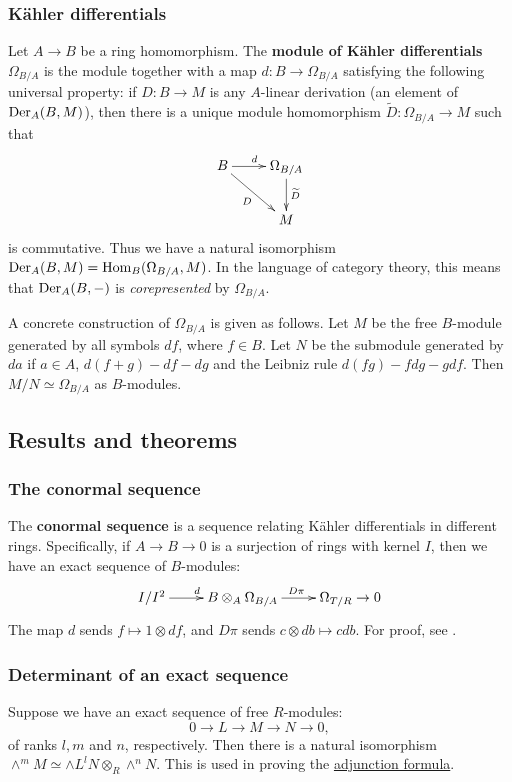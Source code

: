 \documentclass[11pt, english]{article}
\begin{document}
\subsubsection{Kähler differentials}
\label{kahlerdifferentials}

Let $A \to B$ be a ring homomorphism. The \textbf{module of Kähler differentials} $\Omega_{B/A}$ is the module together with a map $d:B \to \Omega_{B/A}$ satisfying the following universal property: if $D:B \to M$ is any $A$-linear derivation (an element of $\operatorname{Der}_A(B,M)$), then there is a unique module homomorphism $\widetilde D:\Omega_{B/A} \to M$ such that
\[
\xymatrix{
B \ar[r]^d  \ar[dr]_D & \Omega_{B/A} \ar[d]^{\widetilde D} \\
 & M
}
\]
is commutative. Thus we have a natural isomorphism $\operatorname{Der}_A(B,M)=\operatorname{Hom}_B(\Omega_{B/A},M)$. In the language of category theory, this means that $\operatorname{Der}_A(B,-)$ is \emph{corepresented} by $\Omega_{B/A}$. 

A concrete construction of $\Omega_{B/A}$ is given as follows. Let $M$ be the free $B$-module generated by all symbols $df$, where $f \in B$. Let $N$ be the submodule generated by $da$ if $a \in A$, $d(f+g)-df-dg$ and the Leibniz rule $d(fg)-fdg-gdf$. Then $M/N \simeq \Omega_{B/A}$ as $B$-modules.

\subsection{Results and theorems}
\subsubsection{The conormal sequence}
\label{conormalsequence}

The \textbf{conormal sequence} is a sequence relating Kähler differentials in different rings. Specifically, if $A \to B \to 0$ is a surjection of rings with kernel $I$, then we have an exact sequence of $B$-modules:
\[
\xymatrix{
I/I^2 \ar[r]^d & B \otimes_A \Omega_{B/A} \ar[r]^{D\pi} & \Omega_{T/R} \to 0
}
\]
The map $d$ sends $f \mapsto 1 \otimes df$, and $D \pi$ sends $c \otimes db \mapsto c db$. For proof, see \cite[Chapter 16]{eisenbud}.

\subsubsection{Determinant of an exact sequence}
\label{determinantsequence}

Suppose we have an exact sequence of free $R$-modules:
\[
0 \to L \to M \to N \to 0,
\]
of ranks $l,m$ and $n$, respectively. Then there is a natural isomorphism $\wedge^m M \simeq \wedge L^l N \otimes_R \wedge^n N$.  This is used in proving the \hyperref[adjunction]{adjunction formula}.
\end{document}
